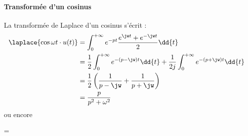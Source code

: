 \paragraph{Transformée d'un cosinus}
La transformée de Laplace d'un cosinus s'écrit :
\begin{align*}
\laplace{\cos{\omega t}\cdot u(t)}&=\int_{0}^{+\infty}e^{-pt}\dfrac{e^{\jw t}+e^{-\jw t}}{2}\dd{t}\\
&=\dfrac{1}{2}\int_{0}^{+\infty}e^{-(p-\jw)t}\dd{t} + \dfrac{1}{2j}\int_{0}^{+\infty}e^{-(p+\jw)t}\dd{t} \\
&=\dfrac{1}{2}\left( \dfrac{1}{p-\jw}+\dfrac{1}{p+\jw}\right)\\
&=\dfrac{p}{p^2+\omega^2}
\end{align*}
ou encore
\begin{bequation}
    =
\end{bequation}




